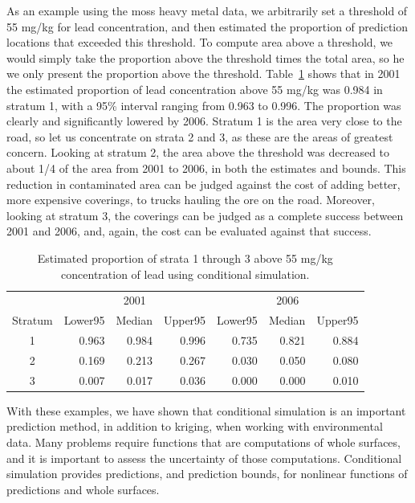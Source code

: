 \documentclass[12pt, titlepage]{article}
\begin{document}
As an example using the moss heavy metal data, we arbitrarily set a threshold of 55 mg/kg for lead concentration, and then estimated the proportion of prediction locations that exceeded this threshold.  To compute area above a threshold, we would simply take the proportion above the threshold times the total area, so he we only present the proportion above the threshold.  Table~\ref{tab:PAboveThresh} shows that in 2001 the estimated proportion of lead concentration above 55 mg/kg was 0.984 in stratum 1, with a 95\% interval ranging from 0.963 to 0.996.  The proportion was clearly and significantly lowered by 2006.  Stratum 1 is the area very close to the road, so let us concentrate on strata 2 and 3, as these are the areas of greatest concern.  Looking at stratum 2, the area above the threshold was decreased to about 1/4 of the area from 2001 to 2006, in both the estimates and bounds.  This reduction in contaminated area can be judged against the cost of adding better, more expensive coverings, to trucks hauling the ore on the road.  Moreover, looking at stratum 3, the coverings can be judged as a complete success between 2001 and 2006, and, again, the cost can be evaluated against that success.

\begin{table}[h] 
				\caption{Estimated proportion of strata 1 through 3 above 55 mg/kg concentration of lead using conditional simulation. \label{tab:PAboveThresh}}
\begin{center}
\begin{tabular}{c|rrr|rrr|}
  \hline
  \hline{}
  {} & \multicolumn{3}{c|}{2001} & \multicolumn{3}{c|}{2006} \\
  Stratum & Lower95 & Median & Upper95 & Lower95 & Median & Upper95 \\
	\hline
  \hline
	1 & 0.963 & 0.984 & 0.996 & 0.735 & 0.821 & 0.884 \\ 
  2 & 0.169 & 0.213 & 0.267 & 0.030 & 0.050 & 0.080 \\ 
  3 & 0.007 & 0.017 & 0.036 & 0.000 & 0.000 & 0.010 \\ 
  \hline
	\hline
\end{tabular}
\end{center}
\end{table}

With these examples, we have shown that conditional simulation is an important prediction method, in addition to kriging, when working with environmental data.  Many problems require functions that are computations of whole surfaces, and it is important to assess the uncertainty of those computations.  Conditional simulation provides predictions, and prediction bounds, for nonlinear functions of predictions and whole surfaces.
\end{document}

